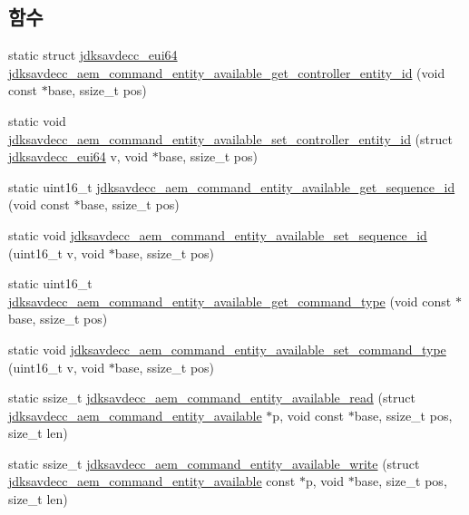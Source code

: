 \subsection*{함수}
\begin{DoxyCompactItemize}
\item 
static struct \hyperlink{structjdksavdecc__eui64}{jdksavdecc\+\_\+eui64} \hyperlink{group__command__entity__available_ga18c696597b73276c8b9e73d0a0b7e74e}{jdksavdecc\+\_\+aem\+\_\+command\+\_\+entity\+\_\+available\+\_\+get\+\_\+controller\+\_\+entity\+\_\+id} (void const $\ast$base, ssize\+\_\+t pos)
\item 
static void \hyperlink{group__command__entity__available_ga793d475dcaa9bf6ace9c3f0a37cd7d15}{jdksavdecc\+\_\+aem\+\_\+command\+\_\+entity\+\_\+available\+\_\+set\+\_\+controller\+\_\+entity\+\_\+id} (struct \hyperlink{structjdksavdecc__eui64}{jdksavdecc\+\_\+eui64} v, void $\ast$base, ssize\+\_\+t pos)
\item 
static uint16\+\_\+t \hyperlink{group__command__entity__available_gaffe219bc8cdb0d359915d7d67b58f7c1}{jdksavdecc\+\_\+aem\+\_\+command\+\_\+entity\+\_\+available\+\_\+get\+\_\+sequence\+\_\+id} (void const $\ast$base, ssize\+\_\+t pos)
\item 
static void \hyperlink{group__command__entity__available_ga97158afc9855a28a43c09ed0bdac2749}{jdksavdecc\+\_\+aem\+\_\+command\+\_\+entity\+\_\+available\+\_\+set\+\_\+sequence\+\_\+id} (uint16\+\_\+t v, void $\ast$base, ssize\+\_\+t pos)
\item 
static uint16\+\_\+t \hyperlink{group__command__entity__available_ga53f83110419a63e805163bed6f03f7a3}{jdksavdecc\+\_\+aem\+\_\+command\+\_\+entity\+\_\+available\+\_\+get\+\_\+command\+\_\+type} (void const $\ast$base, ssize\+\_\+t pos)
\item 
static void \hyperlink{group__command__entity__available_ga134ca6ed016666b84217b038199b1fa6}{jdksavdecc\+\_\+aem\+\_\+command\+\_\+entity\+\_\+available\+\_\+set\+\_\+command\+\_\+type} (uint16\+\_\+t v, void $\ast$base, ssize\+\_\+t pos)
\item 
static ssize\+\_\+t \hyperlink{group__command__entity__available_ga204983a41f7b04c5b381f8e90961d975}{jdksavdecc\+\_\+aem\+\_\+command\+\_\+entity\+\_\+available\+\_\+read} (struct \hyperlink{structjdksavdecc__aem__command__entity__available}{jdksavdecc\+\_\+aem\+\_\+command\+\_\+entity\+\_\+available} $\ast$p, void const $\ast$base, ssize\+\_\+t pos, size\+\_\+t len)
\item 
static ssize\+\_\+t \hyperlink{group__command__entity__available_gaa12d3055d62b15ce98d231278ab54288}{jdksavdecc\+\_\+aem\+\_\+command\+\_\+entity\+\_\+available\+\_\+write} (struct \hyperlink{structjdksavdecc__aem__command__entity__available}{jdksavdecc\+\_\+aem\+\_\+command\+\_\+entity\+\_\+available} const $\ast$p, void $\ast$base, size\+\_\+t pos, size\+\_\+t len)
\end{DoxyCompactItemize}


